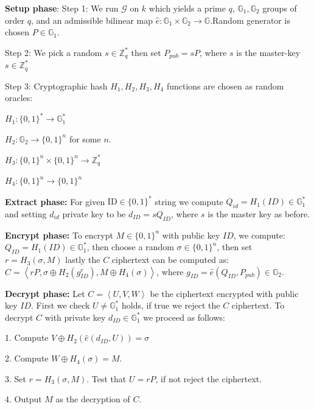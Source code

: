 \begin{algorithm}[H]
	\SetAlgoLined
	\textbf{Setup phase}: \;
		Step 1: We run $\mathcal{G}$ on $k$ which yields a prime $q$, $\mathbb{G}_1, \mathbb{G}_2$ groups of order $q$, and an admissible bilinear map $\hat{e}: \mathbb{G}_1 \times \mathbb{G}_2 \rightarrow \mathbb{G}$.Random generator is chosen $P \in \mathbb{G}_1$.
		
		Step 2: We pick a random $s \in \mathbb{Z}^{*}_{q}$ then set $P_{pub} = sP$, where $s$ is the master-key $s \in \mathbb{Z}^*_q$
		
		Step 3: Cryptographic hash $H_1, H_2, H_3, H_4$ functions are chosen as random oracles:
			
			$H_1: \{ 0,1 \}^* \rightarrow \mathbb{G}^*_1$
			
			$H_2: \mathbb{G}_2 \rightarrow \{0,1\}^n$ for some $n$.
			
			$H_3: \{0,1\}^n \times \{0,1\}^n \rightarrow \mathbb{Z}^*_q $ 
			
			$H_4: \{0,1\}^n \rightarrow \{0,1\}^n $
	
	\textbf{Extract phase: }\;
	 For given $\mathrm{ID} \in \{0,1\}^*$ string we compute $Q_{id}=H_1(ID) \in \mathbb{G}^*_1$ and setting $d_{id}$ private key to be $d_{ID} = sQ_{ID}$, where $s$ is the master key as before.
	
	\textbf{Encrypt phase: }\;
		To encrypt $M\in \{0,1\}^n$ with public key $ID$, we compute: $Q_{ID} = H_1(ID) \in \mathbb{G}^*_1$, then choose a random $\sigma \in \{0,1\}^n$, then set $r=H_3(\sigma, M)$ lastly the $C$ ciphertext can be computed as: $C = \left< rP, \sigma \oplus H_2(g^r_{ID}), M \oplus H_4(\sigma) \right>$, where $g_{ID} = \hat{e}(Q_{ID}, P_{pub})\in \mathbb{G}_2$.
	
	\textbf{Decrypt phase: }\;
		Let $C = \left< U,V,W \right>$ be the ciphertext encrypted with public key $ID$. First we check $U \neq \mathbb{G}^*_1$ holds, if true we reject the $C$ ciphertext. To decrypt $C$ with private key $d_{ID} \in \mathbb{G}^*_1$ we proceed as follows:
			
			1. Compute $V \oplus H_2(\hat{e}(d_{ID}, U)) = \sigma$
			
			2. Compute $W \oplus H_4(\sigma) = M$.
			
			3. Set  $r= H_3(\sigma, M)$. Test that $U = rP$, if not reject the ciphertext.
			
			4. Output $M$ as the decryption of $C$.
	\caption{Boneh-Franklin based scheme: FullIdent Algorithm}\label{code:p.FullIdent}
\end{algorithm}

